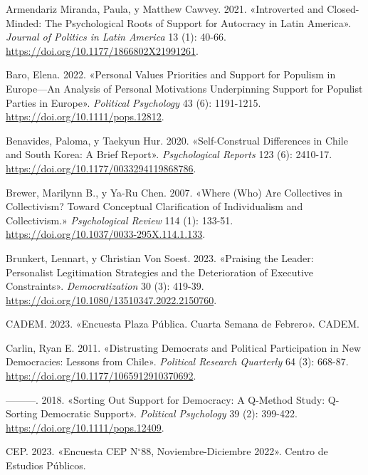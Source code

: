 \documentclass[
  letterpaper,
  DIV=11,
  numbers=noendperiod]{scrartcl}
\newlength{\cslhangindent}
\newenvironment{CSLReferences}[2] %
 {\begin{list}{}{%
  \setlength{\itemindent}{0pt}
  \setlength{\leftmargin}{0pt}
  \setlength{\parsep}{0pt}
  \ifodd #1
   \setlength{\leftmargin}{\cslhangindent}
   \setlength{\itemindent}{-1\cslhangindent}
  \fi
  \setlength{\itemsep}{#2\baselineskip}}}
 {\end{list}}
\begin{document}
\begin{CSLReferences}{1}{0}
Armendariz Miranda, Paula, y Matthew Cawvey. 2021. {«Introverted and
{Closed-Minded}: {The Psychological Roots} of {Support} for {Autocracy}
in {Latin America}»}. \emph{Journal of Politics in Latin America} 13
(1): 40-66. \url{https://doi.org/10.1177/1866802X21991261}.

Baro, Elena. 2022. {«Personal {Values Priorities} and {Support} for
{Populism} in {Europe}---{An Analysis} of {Personal Motivations
Underpinning Support} for {Populist Parties} in {Europe}»}.
\emph{Political Psychology} 43 (6): 1191-1215.
\url{https://doi.org/10.1111/pops.12812}.

Benavides, Paloma, y Taekyun Hur. 2020. {«Self-{Construal Differences}
in {Chile} and {South Korea}: {A Brief Report}»}. \emph{Psychological
Reports} 123 (6): 2410-17.
\url{https://doi.org/10.1177/0033294119868786}.

Brewer, Marilynn B., y Ya-Ru Chen. 2007. {«Where ({Who}) {Are
Collectives} in {Collectivism}? {Toward Conceptual Clarification} of
{Individualism} and {Collectivism}.»} \emph{Psychological Review} 114
(1): 133-51. \url{https://doi.org/10.1037/0033-295X.114.1.133}.

Brunkert, Lennart, y Christian Von Soest. 2023. {«Praising the Leader:
Personalist Legitimation Strategies and the Deterioration of Executive
Constraints»}. \emph{Democratization} 30 (3): 419-39.
\url{https://doi.org/10.1080/13510347.2022.2150760}.

CADEM. 2023. {«Encuesta {Plaza P{ú}blica}. {Cuarta Semana} de
{Febrero}»}. CADEM.

Carlin, Ryan E. 2011. {«Distrusting {Democrats} and {Political
Participation} in {New Democracies}: {Lessons} from {Chile}»}.
\emph{Political Research Quarterly} 64 (3): 668-87.
\url{https://doi.org/10.1177/1065912910370692}.

---------. 2018. {«Sorting {Out Support} for {Democracy}: {A Q-Method
Study}: {Q-Sorting Democratic Support}»}. \emph{Political Psychology} 39
(2): 399-422. \url{https://doi.org/10.1111/pops.12409}.

CEP. 2023. {«Encuesta {CEP N}{\(^\circ\)}88, {Noviembre-Diciembre}
2022»}. Centro de Estudios P{ú}blicos.


\end{CSLReferences}
\end{document}
